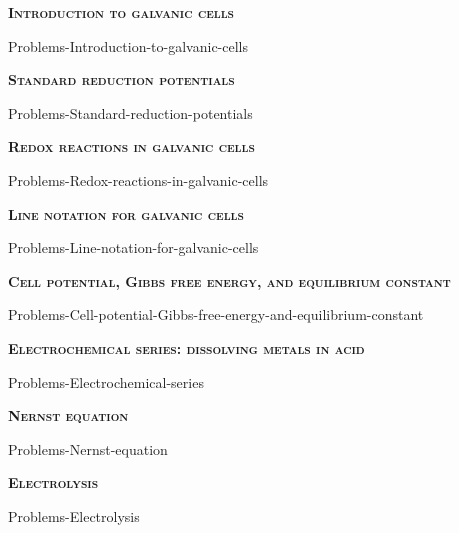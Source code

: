 \documentclass[main.tex]{subfiles}
\begin{document}
\newcommand\chapterlabel{Ch-electrochem}
\newpage
{}
\fancyhfoffset[E,O]{0pt}
\setlength{\columnsep}{30pt}
\begin{conclusion}
\iftoggle{chem121}{}{\setcounter{chapter}{8}}
\end{conclusion}
\begin{multicols*}{2}\setcounter{numA}{1}  %

{\raggedright\textsc{\textbf{Introduction to galvanic cells}}\par} {Problems-Introduction-to-galvanic-cells}
{\raggedright\textsc{\textbf{Standard reduction potentials}}\par} {Problems-Standard-reduction-potentials}
{\raggedright\textsc{\textbf{Redox reactions in galvanic cells}}\par} {Problems-Redox-reactions-in-galvanic-cells}
{\raggedright\textsc{\textbf{Line notation for galvanic cells}}\par} {Problems-Line-notation-for-galvanic-cells}
{\raggedright\textsc{\textbf{Cell potential, Gibbs free energy, and equilibrium constant}}\par} {Problems-Cell-potential-Gibbs-free-energy-and-equilibrium-constant}
{\raggedright\textsc{\textbf{Electrochemical series: dissolving metals in acid}}\par} {Problems-Electrochemical-series}
{\raggedright\textsc{\textbf{Nernst equation}}\par} {Problems-Nernst-equation}
{\raggedright\textsc{\textbf{Electrolysis}}\par} {Problems-Electrolysis}


\end{multicols*} \iftoggle{showfinalanswers}{
\newpage\fancyhfoffset[E,O]{0pt}
\begin{answerbox}
\begin{answersenvironment}
 \begin{localsize}{10}
{ \checkoddpage\ifoddpage    \else   \clearpage\thispagestyle{empty}\mbox{}\clearpage\fi
\Large \bf Answers}
\SetupExSheets{ headings = inline-nr , counter-format = qu) ,}
\providetoggle{printOddAnswers}\settoggle{printOddAnswers}{\printOddAnswers}\iftoggle{printOddAnswers}{\printsolutions[section] }{\printsolutions}
  \vspace{20cm}
 \end{localsize}
 \end{answersenvironment}
\end{answerbox}
}{}
\checkoddpage\ifoddpage   \clearpage\thispagestyle{empty}\mbox{}\clearpage \else   \fi
\end{document}

